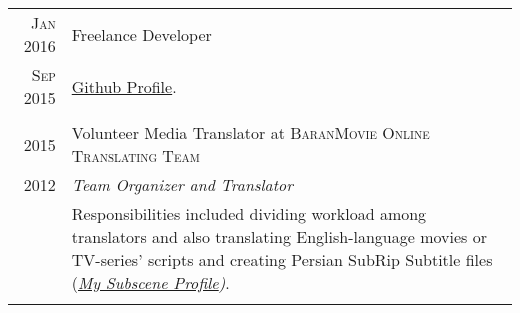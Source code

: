 \documentclass[a4paper,10pt]{article}
\begin{document}
\begin{longtable}{r|p{14.70cm}}
    \textsc{Jan 2016} & Freelance Developer \\
    \textsc{Sep 2015} & \footnotesize{\href{https://github.com/anewage}{Github Profile}.}\\\multicolumn{2}{c}{} \\
    
    
    \textsc{2015} & Volunteer Media Translator at \textsc{BaranMovie Online Translating Team} \\
    \textsc{2012} & \emph{Team Organizer and Translator}\\
    & \footnotesize{Responsibilities included dividing workload among translators and also translating English-language movies or TV-series' scripts and creating Persian SubRip Subtitle files (\textit{\href{https://subscene.com/u/618697}{My Subscene Profile})}.}\\\multicolumn{2}{c}{} \\
 
\end{longtable}

\end{document}
